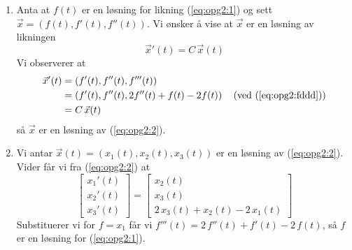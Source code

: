 \documentclass{article}[norsk]
\begin{document}
\begin{enumerate}[label=(\textit{\roman*})]
	\item Anta at $f(t)$ er en løsning for likning (\ref{eq:opg2:1}) og sett $\vec{x}=\left(f(t),f'(t),f''(t)\right)$. Vi ønsker å vise at $\vec{x}$ er en løsning av likningen
    \begin{equation}\label{eq:opg2:2}
    	\vec{x}'(t)=C\,\vec{x}(t)
    \end{equation}
Vi observerer at
\begin{equation*} \begin{aligned}
	\vec{x}'(t)&=\left(f'(t),f''(t),f'''(t)\right)\\
    &=\left(f'(t),f''(t),2f''(t)+f(t)-2f(t)\right)\quad (\text{ved (\ref{eq:opg2:fddd})})\\
    &=C\,\vec{x}(t)
\end{aligned} \end{equation*}
så $\vec{x}$ er en løsning av (\ref{eq:opg2:2}).
	\item Vi antar $\vec{x}(t)=\left(x_1(t),x_2(t),x_3(t)\right)$ er en løsning av (\ref{eq:opg2:2}). Vider får vi fra (\ref{eq:opg2:2}) at  
    \begin{equation*}
    \begin{bmatrix} x_1'(t)\\x_2'(t)\\x_3'(t)\end{bmatrix}=\begin{bmatrix} x_2(t)\\x_3(t)\\2\,x_3(t)+x_2(t)-2\,x_1(t)\end{bmatrix}
    \end{equation*}
Substituerer vi for $f=x_1$ får vi $f'''(t)=2\,f''(t)+f'(t)-2\,f(t)$, så $f$ er en løsning for (\ref{eq:opg2:1}).    


\end{enumerate}
\end{document}
